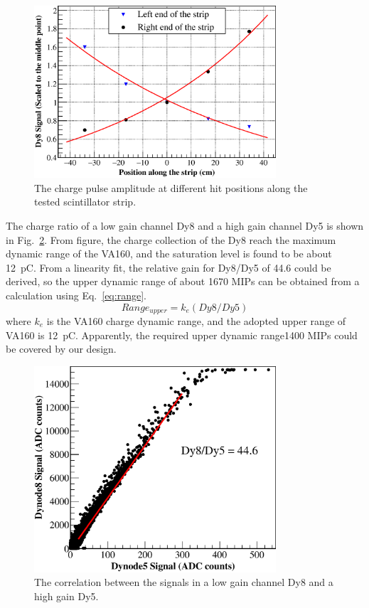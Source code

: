 \documentclass[5p, times]{elsarticle}
\begin{document}
\begin{figure}
 \centering
 \includegraphics[width=90mm]{attenuation}
\caption{The charge pulse amplitude at different hit positions along the tested scintillator strip.}
\label{fig:attenuation}
\end{figure} 

The charge ratio of a low gain channel Dy8 and a high gain channel Dy5 is shown in Fig.~\ref{fig:dy58}. 
From figure, the charge collection of the Dy8 reach the maximum dynamic range of the VA160, and the saturation level is found to be about \SI{12}{\pico\coulomb}. 
From a linearity fit, the relative gain for Dy8/Dy5 of 44.6 could be derived, so the upper dynamic range of about 1670 MIPs can be obtained from a calculation using Eq.~\ref{eq:range}.
\begin{equation}
 Range_{upper} = k_{e}(Dy8/Dy5)
 \label{eq:range}
\end{equation} 
where $k_e$ is the VA160 charge dynamic range, and the adopted upper range of VA160 is \SI{12}{\pico\coulomb}.
Apparently, the required upper dynamic range1400 MIPs could be covered by our design.

\begin{figure}
 \centering
 \includegraphics[width=90mm]{dy58}
\caption{The correlation between the signals in a low gain channel Dy8 and a high gain Dy5.}
\label{fig:dy58}
\end{figure} 
\end{document}
